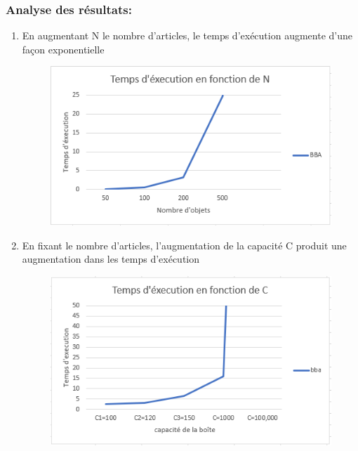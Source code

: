 \documentclass[12pt]{article}
\begin{document}
\subsubsection{Analyse des résultats:}
\begin{enumerate}
    \item En augmentant N le nombre d’articles, le temps d'exécution augmente d’une façon exponentielle
    \begin{figure}[H]
        \includegraphics[width=13.5cm]{../figures/BBA_TEXEC_N.PNG}
    \end{figure}
    \item En fixant le nombre d’articles, l’augmentation de la capacité C produit une augmentation dans les temps d’exécution
    \begin{figure}[H]
        \includegraphics[width=13.5cm]{../figures/BBA_TEXEC_C.PNG}
    \end{figure}
\end{enumerate}
\end{document}
